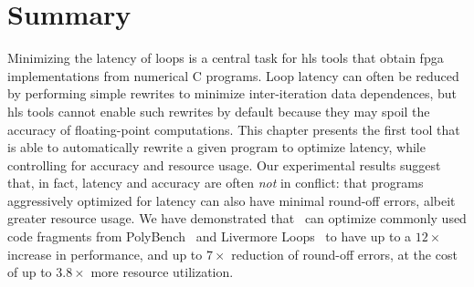 \section{Summary}
\label{lo:sec:conclusion}

Minimizing the latency of loops is a central task for \gls{hls} tools that
obtain \gls{fpga} implementations from numerical C programs.  Loop latency can
often be reduced by performing simple rewrites to minimize inter-iteration
data dependences, but \gls{hls} tools cannot enable such rewrites by default
because they may spoil the accuracy of floating-point computations.  This
chapter presents the first tool that is able to automatically rewrite a given
program to optimize latency, while controlling for accuracy and resource
usage.  Our experimental results suggest that, in fact, latency and accuracy
are often \emph{not} in conflict: that programs aggressively optimized for
latency can also have minimal round-off errors, albeit greater resource usage.
We have demonstrated that \soap~can optimize commonly used code fragments from
PolyBench~\cite{polybench} and Livermore Loops~\cite{livermore} to have up to a
$12\times$ increase in performance, and up to $7\times$ reduction of round-off
errors, at the cost of up to $3.8\times$ more resource utilization.

